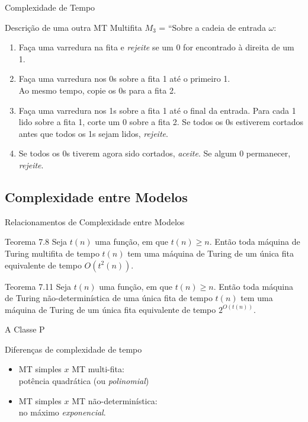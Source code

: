 \documentclass[xcolor=dvipsnames,table]{beamer}
\begin{document}
	\begin{frame}[shrink]{Complexidade de Tempo}
		\begin{block}{Descrição de uma outra MT Multifita}
			$M_3$ = ``Sobre a cadeia de entrada $\omega$:
			\begin{enumerate}
				\item Faça uma varredura na fita e {\it rejeite} se um 0 for encontrado à direita de um 1.
				\item Faça uma varredura nos 0s sobre a fita 1 até o primeiro 1. \\Ao mesmo tempo, copie os 0s para a fita 2.
				\item Faça uma varredura nos 1s sobre a fita 1 até o final da entrada. Para cada 1 lido sobre a fita 1, corte um 0 sobre a fita 2. Se todos os 0s estiverem cortados antes que todos os 1s sejam lidos, {\it rejeite}.
				\item Se todos os 0s tiverem agora sido cortados, {\it aceite}. Se algum 0 permanecer, {\it rejeite}.
			\end{enumerate}
		\end{block}
	\end{frame}
	
	\subsection{Complexidade entre Modelos}	
	
	\begin{frame}{Relacionamentos de Complexidade entre Modelos}
		\begin{block}{Teorema 7.8}
			Seja $t(n)$ uma função, em que $t(n) \geq n$. Então toda máquina de Turing multifita de tempo $t(n)$ tem uma máquina de Turing de um única fita equivalente de tempo $O(t^2(n))$.
		\end{block}   
		\begin{block}{Teorema 7.11}
			Seja $t(n)$ uma função, em que $t(n) \geq n$. Então toda máquina de Turing não-determinística de uma única fita de tempo $t(n)$ tem uma máquina de Turing de um única fita equivalente de tempo $2^{O(t(n))}$.	
		\end{block}
	\end{frame}
	
	\begin{frame}{A Classe P}
		\begin{block}{Diferenças de complexidade de tempo}
			\begin{itemize}
				\item MT simples $x$ MT multi-fita: \\potência quadrática (ou {\it polinomial})
				\item MT simples $x$ MT não-determinística: \\no máximo {\it exponencial}.
			\end{itemize} 		
		\end{block}
	\end{frame}
	
\end{document}
